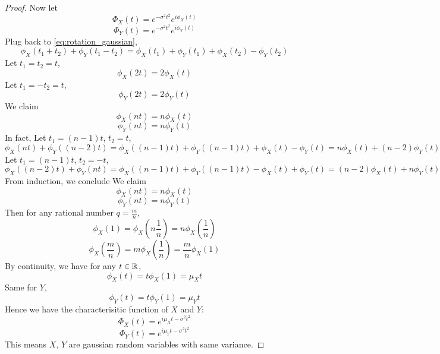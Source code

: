 \begin{proof}
	Now let
	$$\Phi_X(t) = e^{-\sigma^2 t^2} e^{i\phi_X(t)}$$
	$$\Phi_Y(t) = e^{-\sigma^2 t^2} e^{i\phi_Y(t)}$$
	Plug back to \ref{eq:rotation_gaussian},
	$$ \phi_X(t_1+t_2)+\phi_Y(t_1-t_2) = \phi_X(t_1)+\phi_Y(t_1)+\phi_X(t_2) - \phi_Y(t_2)$$
	Let $t_1=t_2=t$,
	$$ \phi_X(2t) = 2\phi_X(t)$$
	Let $t_1=-t_2=t$,
	$$ \phi_Y(2t) = 2\phi_Y(t)$$
	We claim
	$$ \phi_X(nt) = n\phi_X(t)$$
	$$ \phi_Y(nt) = n\phi_Y(t)$$
	In fact, Let $t_1=(n-1)t$, $t_2=t$,
	$$ \phi_X(nt)+\phi_Y((n-2)t) = \phi_X((n-1)t)+\phi_Y((n-1)t)+\phi_X(t) - \phi_Y(t) = n\phi_X(t) + (n-2)\phi_Y(t) $$
	Let $t_1=(n-1)t$, $t_2=-t$,
	$$ \phi_X((n-2)t)+\phi_Y(nt) = \phi_X((n-1)t)+\phi_Y((n-1)t)-\phi_X(t) + \phi_Y(t) = (n-2)\phi_X(t) +n\phi_Y(t) $$
	From induction, we conclude
	We claim
	$$ \phi_X(nt) = n\phi_X(t)$$
	$$ \phi_Y(nt) = n\phi_Y(t)$$
	Then for any rational number $q=\frac{m}{n}$,
	$$ \phi_X(1) = \phi_X(n\frac{1}{n}) = n\phi_X(\frac{1}{n})$$
	$$\phi_X(\frac{m}{n}) = m\phi_X(\frac{1}{n}) = \frac{m}{n}\phi_X(1)$$
	By continuity, we have for any $t\in \mathbb{R}$,
	$$\phi_X(t) = t\phi_X(1)=\mu_X t$$
	Same for $Y$,
	$$\phi_Y(t) = t\phi_Y(1)=\mu_Y t$$
	Hence we have the characterisitic function of $X$ and $Y$:
	$$\Phi_X(t) = e^{i\mu_Xt - \sigma^2t^2}$$
	$$\Phi_Y(t) = e^{i\mu_Yt - \sigma^2t^2}$$
	This means $X$, $Y$ are gaussian random variables with same variance.
\end{proof}